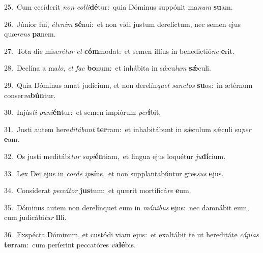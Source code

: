 {\numbfont\textcolor{\numbcolor}{25.}}~Cum cecíderit \textit{non} \textit{col}\-\textit{li}\textbf{dé}tur:~\star quia Dóminus suppónit ma\textit{num} \textbf{su}\-am.\par
{\numbfont\textcolor{\numbcolor}{26.}}~Júnior fui, \textit{ét}\-\textit{e}\textit{nim} \textbf{sé}\-nui:~\star et non vidi justum derelíctum, nec semen ejus quæ\textit{rens} \textbf{pa}\-nem.\par
{\numbfont\textcolor{\numbcolor}{27.}}~Tota die mise\-\textit{ré}\-\textit{tur} \textit{et} \textbf{cóm}\-modat:~\star et semen illíus in benedictió\textit{ne} \textbf{e}\-rit.\par
{\numbfont\textcolor{\numbcolor}{28.}}~Declína a ma\-\textit{lo}\-, \textit{et} \textit{fac} \textbf{bo}\-num:~\star et inhábita in sǽcu\textit{lum} \textbf{sǽ}\-culi.\par
{\numbfont\textcolor{\numbcolor}{29.}}~Quia Dóminus amat judícium, et non derelín\textit{quet} \textit{sanc}\-\textit{tos} \textbf{su}\-os:~\star in ætérnum conser\-\textit{va}\-\textbf{bún}tur.\par
{\numbfont\textcolor{\numbcolor}{30.}}~Injús\textit{ti} \textit{pu}\-\textit{ni}\textbf{én}tur:~\star et semen impiórum \textit{per}\-\textbf{í}bit.\par
{\numbfont\textcolor{\numbcolor}{31.}}~Justi autem here\-\textit{di}\-\textit{tá}\textit{bunt} \textbf{ter}\-ram:~\star et inhabitábunt in sǽculum sǽculi su\textit{per} \textbf{e}\-am.\par
{\numbfont\textcolor{\numbcolor}{32.}}~Os justi meditábi\textit{tur} \textit{sa}\-\textit{pi}\textbf{én}tiam,~\star et lingua ejus loquétur \textit{ju}\-\textbf{dí}cium.\par
{\numbfont\textcolor{\numbcolor}{33.}}~Lex Dei ejus in \textit{cor}\-\textit{de} \textit{ip}\-\textbf{sí}us,~\star et non supplantabúntur gres\textit{sus} \textbf{e}\-jus.\par
{\numbfont\textcolor{\numbcolor}{34.}}~Consíderat \textit{pec}\-\textit{cá}\textit{tor} \textbf{jus}\-tum:~\star et quærit mortificá\textit{re} \textbf{e}\-um.\par
{\numbfont\textcolor{\numbcolor}{35.}}~Dóminus autem non derelínquet eum in \textit{má}\-\textit{ni}\textit{bus} \textbf{e}\-jus:~\star nec damnábit eum, cum judicábi\textit{tur} \textbf{il}\-li.\par
{\numbfont\textcolor{\numbcolor}{36.}}~Exspécta Dóminum, et custódi viam ejus:~\dagger et exaltábit te ut hereditáte \textit{cá}\-\textit{pi}\textit{as} \textbf{ter}\-ram:~\star cum períerint peccatóres \textit{vi}\-\textbf{dé}bis.\par
